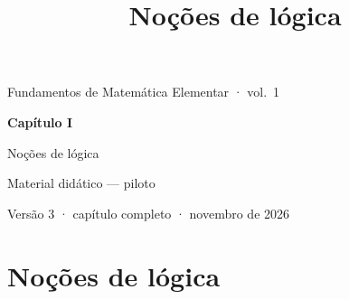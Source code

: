 \documentclass[11pt,twoside,openany]{book}
\title{Noções de lógica}
\begin{document}
\frontmatter
\begin{titlepage}
  \centering\sffamily
  \vspace*{5cm}
  {\color{cinza}\large Fundamentos de Matemática Elementar · vol.~1\par}
  \vspace{1.2em}
  {\color{acento}\Huge\bfseries Capítulo I\par\vspace{0.3em}Noções de lógica\par}
  \vspace{2em}
  {\large Material didático — piloto\par}
  \vfill
  {\small\color{cinza}Versão 3 · capítulo completo · novembro de 2026\par}
\end{titlepage}
\tableofcontents

\mainmatter
\chapter{Noções de lógica}







\clearpage


\backmatter

\end{document}
